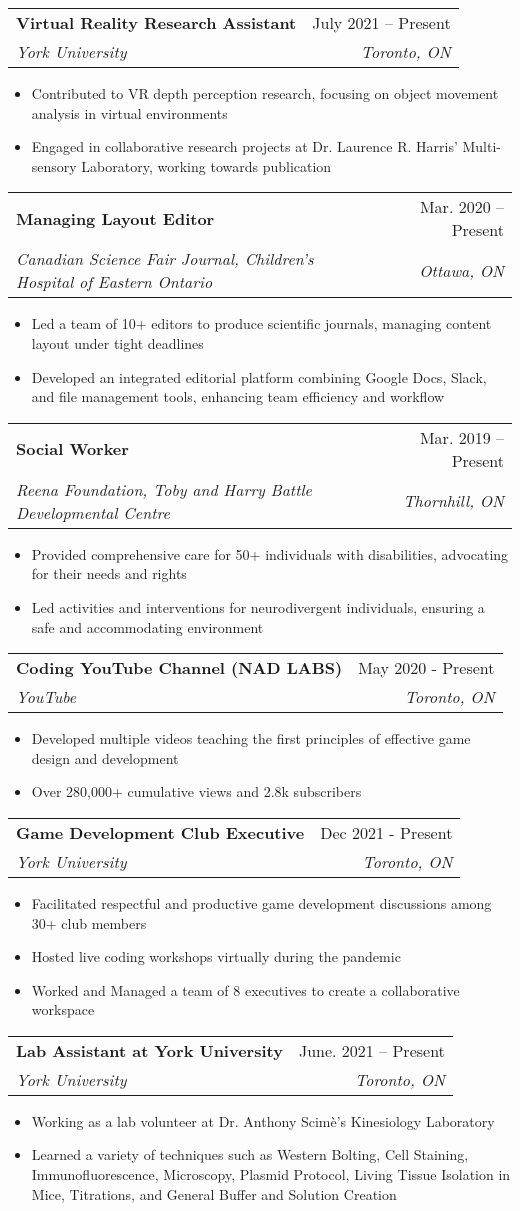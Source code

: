\documentclass[letterpaper,11pt]{article}
\makeatletter
\newcommand{\resumeItem}[1]{
  \item\small{
    {#1 \vspace{-2pt}}
  }
}
\newcommand{\resumeSubheading}[4]{
  \vspace{-2pt}\item
    \begin{tabular*}{0.97\textwidth}[t]{l@{\extracolsep{\fill}}r}
      \textbf{#1} & #2 \\
      \textit{\small#3} & \textit{\small #4} \\
    \end{tabular*}\vspace{-7pt}
}
\newcommand{\resumeItemListStart}{\begin{itemize}}
\newcommand{\resumeItemListEnd}{\end{itemize}\vspace{-5pt}}
\makeatother
\begin{document}
    \resumeSubheading
      {Virtual Reality Research Assistant}{July 2021 -- Present}
      {York University}{Toronto, ON}
      \resumeItemListStart
        \resumeItem{Contributed to VR depth perception research, focusing on object movement analysis in virtual environments}
        \resumeItem{Engaged in collaborative research projects at Dr. Laurence R. Harris' Multi-sensory Laboratory, working towards publication}
    \resumeItemListEnd
    
    \resumeSubheading
      {Managing Layout Editor}{Mar. 2020 -- Present}
      {Canadian Science Fair Journal, Children’s Hospital of Eastern Ontario}{Ottawa, ON}
      \resumeItemListStart
        \resumeItem{Led a team of 10+ editors to produce scientific journals, managing content layout under tight deadlines}
        \resumeItem{Developed an integrated editorial platform combining Google Docs, Slack, and file management tools, enhancing team efficiency and workflow}
    \resumeItemListEnd

    \resumeSubheading
      {Social Worker}{Mar. 2019 -- Present}
      {Reena Foundation, Toby and Harry Battle Developmental Centre}{Thornhill, ON}
      \resumeItemListStart
        \resumeItem{Provided comprehensive care for 50+ individuals with disabilities, advocating for their needs and rights}
        \resumeItem{Led activities and interventions for neurodivergent individuals, ensuring a safe and accommodating environment}
    \resumeItemListEnd

    \resumeSubheading
      {Coding YouTube Channel (NAD LABS)}{May 2020 - Present}     
      {YouTube}{Toronto, ON}
      \resumeItemListStart
        \resumeItem{Developed multiple videos teaching the first principles of effective game design and development}
        \resumeItem{Over 280,000+ cumulative views and 2.8k subscribers}
    \resumeItemListEnd

    \resumeSubheading
      {Game Development Club Executive}{Dec 2021 - Present}     
      {York University}{Toronto, ON}
      \resumeItemListStart
        \resumeItem{Facilitated respectful and productive game development discussions among 30+ club members}
        \resumeItem{Hosted live coding workshops virtually during the pandemic}
        \resumeItem{Worked and Managed a team of 8 executives to create a collaborative workspace}
    \resumeItemListEnd
    
    \resumeSubheading
      {Lab Assistant at York University}{June. 2021 -- Present}
      {York University}{Toronto, ON}
      \resumeItemListStart
        \resumeItem{Working as a lab volunteer at Dr. Anthony Scimè's Kinesiology Laboratory}
        \resumeItem{Learned a variety of techniques such as Western Bolting, Cell Staining, Immunofluorescence, Microscopy, Plasmid Protocol, Living Tissue Isolation in Mice, Titrations, and General Buffer and Solution Creation }
    \resumeItemListEnd
\end{document}
